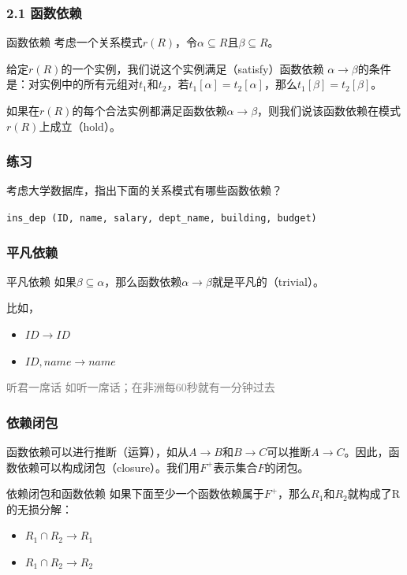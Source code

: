 \documentclass[aspectratio=169, 14pt]{beamer}
\begin{document}
\begin{frame}
	\frametitle{2.1 函数依赖}
	\begin{exampleblock}{函数依赖}
		考虑一个关系模式$r(R)$，令$\alpha \subseteq R$且$\beta \subseteq R$。

		给定$r(R)$的一个实例，我们说这个实例满足（satisfy）\alert{函数依赖} $\alpha \rightarrow \beta$的条件是：对实例中的所有元组对$t_1$和$t_2$，若$t_1[\alpha] = t_2[\alpha]$，那么$t_1[\beta] = t_2[\beta]$。
	\end{exampleblock}

	如果在$r(R)$的每个合法实例都满足函数依赖$\alpha \rightarrow \beta$，则我们说该函数依赖在模式$r(R)$上成立（hold）。
\end{frame}

\begin{frame}
	\frametitle{练习}
	考虑大学数据库，指出下面的关系模式有哪些函数依赖？

	\texttt{ins\_dep (ID, name, salary, dept\_name, building, budget)
	}

\end{frame}

\begin{frame}
	\frametitle{平凡依赖}
	\begin{exampleblock}{平凡依赖}
		如果$\beta \subseteq \alpha$，那么函数依赖$\alpha \rightarrow \beta$就是\alert{平凡的}（trivial）。
	\end{exampleblock}

	比如，
	\begin{itemize}
		\item $ID \rightarrow ID$
		\item $ID, name \rightarrow name$
	\end{itemize}

	\textcolor{gray}{听君一席话 如听一席话；在非洲每60秒就有一分钟过去}
\end{frame}

\begin{frame}
	\frametitle{依赖闭包}
	函数依赖可以进行推断（运算），如从$A \rightarrow B$和$B \rightarrow C$可以推断$A \rightarrow C$。因此，函数依赖可以构成\alert{闭包}（closure）。我们用$F^+$表示集合$F$的闭包。

	\begin{exampleblock}{依赖闭包和函数依赖}
		如果下面至少一个函数依赖属于$F^+$，那么$R_1$和$R_2$就构成了R的无损分解：

		\begin{itemize}
			\item $R_1 \cap R_2 \rightarrow R_1$
			\item $R_1 \cap R_2 \rightarrow R_2$
		\end{itemize}
	\end{exampleblock}

\end{frame}
\end{document}
